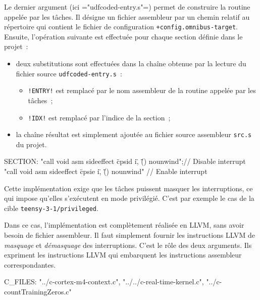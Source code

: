 Le dernier argument (ici \omnibus="udfcoded-entry.s"=) permet de construire la routine appelée par les tâches. Il désigne un fichier assembleur par un chemin relatif au répertoire qui contient le fichier de configuration \texttt{+config.omnibus-target}. Ensuite, l'opération suivante est effectuée pour chaque section définie dans le projet~:
\begin{itemize}
  \item deux substitutions sont effectuées dans la chaîne obtenue par la lecture du fichier source \texttt{udfcoded-entry.s}~:
  \begin{itemize}
    \item \texttt{!ENTRY!} est remplacé par le nom assembleur de la routine appelée par les tâches~;
    \item \texttt{!IDX!} est remplacé par l'indice de la section~;
  \end{itemize}
  \item la chaîne résultat est simplement ajoutée au fichier source assembleur \texttt{src.s} du projet.
\end{itemize}




\begin{OMNIBUS}
SECTION:
"call void asm sideeffect \"cpsid i\", \"\"() nounwind";// Disable interrupt
"call void asm sideeffect \"cpsie i\", \"\"() nounwind" // Enable interrupt
\end{OMNIBUS}

Cette implémentation exige que les tâches puissent masquer les interruptions, ce qui impose qu'elles s'exécutent en mode privilégié. C'est par exemple le cas de la cible \texttt{teensy-3-1/privileged}.

Dans ce cas, l'implémentation est complètement réalisée en LLVM, sans avoir besoin de fichier assembleur. Il faut simplement fournir les instructions LLVM de \emph{masquage} et \emph{démasquage} des interruptions. C'est le rôle des deux arguments. Ils expriment les instructions LLVM qui embarquent les instructions assembleur correspondantes.





\begin{OMNIBUS}
C_FILES:
  "../c-cortex-m4-context.c",
  "../../c-real-time-kernel.c",
  "../c-countTrainingZeros.c"
\end{OMNIBUS}

